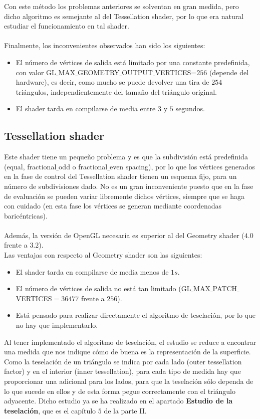 	Con este método los problemas anteriores se solventan en gran medida, pero dicho algoritmo es semejante al del Tessellation shader, por lo que era natural estudiar el funcionamiento en tal shader.\\
	\\ Finalmente, los inconvenientes observados han sido los siguientes:
	\begin{itemize}
		\item El número de vértices de salida está limitado por una constante predefinida, con valor GL$\_$MAX$\_$GEOMETRY$\_$OUTPUT$\_$VERTICES=$256$ (depende del hardware), es decir, como mucho se puede devolver una tira de $254$ triángulos, independientemente del tamaño del triángulo original.
		\item El shader tarda en compilarse de media entre $3$ y $5$ segundos.
	\end{itemize}
	
\subsection*{Tessellation shader}

	Este shader tiene un pequeño problema y es que la subdivisión está predefinida (equal, fractional$\_$odd o fractional$\_$even spacing), por lo que los vértices generados en la fase de control del Tessellation shader tienen un esquema fijo, para un número de subdivisiones dado. No es un gran inconveniente puesto que en la fase de evaluación se pueden variar libremente dichos vértices, siempre que se haga con cuidado (en esta fase los vértices se generan mediante coordenadas baricéntricas). \\
	\\Además, la versión de OpenGL necesaria es superior al del Geometry shader ($4.0$ frente a $3.2$).
	\\ Las ventajas con respecto al Geometry shader son las siguientes:
	\begin{itemize}
		\item El shader tarda en compilarse de media menos de $1s$.
		\item El número de vértices de salida no está tan limitado (GL$\_$MAX$\_$PATCH$\_$VERTICES$=36477$ frente a $256$).
		\item Está pensado para realizar directamente el algoritmo de teselación, por lo que no hay que implementarlo.
	\end{itemize}
	
	Al tener implementado el algoritmo de teselación, el estudio se reduce a encontrar una medida que nos indique cómo de buena es la representación de la superficie. Como la teselación de un triángulo se indica por cada lado (outer tessellation factor) y en el interior (inner tessellation), para cada tipo de medida hay que proporcionar una adicional para los lados, para que la teselación sólo dependa de lo que sucede en ellos y de esta forma pegue correctamente con el triángulo adyacente. Dicho estudio ya se ha realizado en el apartado \textbf{Estudio de la teselación}, que es el capítulo $5$ de la parte II.

